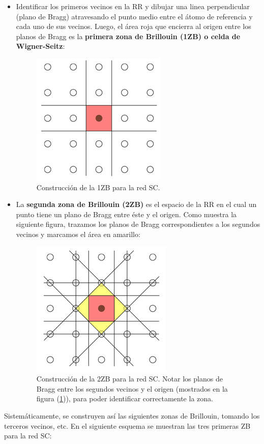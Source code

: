 \documentclass[a4paper]{article}
\begin{document}
\begin{itemize}
\item Identificar los primeros vecinos en la RR y dibujar una linea perpendicular (plano de Bragg) atravesando el punto medio entre el \'atomo de referencia y cada uno de sus vecinos. Luego, el \'area roja que encierra al origen entre los planos de Bragg es la \textbf{primera zona de Brillouin (1ZB) o celda de Wigner-Seitz}:

\begin{figure}[H]
  \centering
  \includegraphics[width=0.3\linewidth,height=0.3\linewidth]{pzb.png}
  \caption{Construcci\'on de la 1ZB para la red SC.}
  \label{fig:pzb}
\end{figure}

\item La \textbf{segunda zona de Brillouin (2ZB)} es el espacio de la RR en el cual un punto tiene un plano de Bragg entre \'este y el origen. Como muestra la siguiente figura, trazamos los planos de Bragg correspondientes a los segundos vecinos y marcamos el \'area en amarillo:

\begin{figure}[H]
  \centering
  \includegraphics[width=0.3\linewidth,height=0.3\linewidth]{szb.png}
  \caption{Construcci\'on de la 2ZB para la red SC. Notar los planos de Bragg entre los segundos vecinos y el origen (mostrados en la figura (\ref{fig:pzb})), para poder identificar correctamente la zona.}
  \label{fig:szb}
\end{figure}

\end{itemize}

Sistem\'aticamente, se construyen as\'i las siguientes zonas de Brillouin, tomando los terceros vecinos, etc. En el siguiente esquema se muestran las tres primeras ZB para la red SC:
\end{document}
